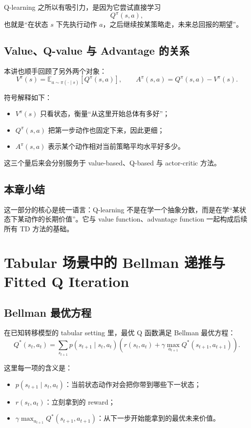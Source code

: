 \documentclass[a4paper]{article}
\begin{document}
Q-learning 之所以有吸引力，是因为它尝试直接学习
\[
Q^\pi(s,a),
\]
也就是“在状态 \(s\) 下先执行动作 \(a\)，之后继续按某策略走，未来总回报的期望”。

\subsection{Value、Q-value 与 Advantage 的关系}

本讲也顺手回顾了另外两个对象：
\[
V^\pi(s)=\mathbb{E}_{a\sim\pi(\cdot\mid s)}[Q^\pi(s,a)],
\qquad
A^\pi(s,a)=Q^\pi(s,a)-V^\pi(s).
\]

符号解释如下：
\begin{itemize}
\item \(V^\pi(s)\) 只看状态，衡量“从这里开始总体有多好”；
\item \(Q^\pi(s,a)\) 把第一步动作也固定下来，因此更细；
\item \(A^\pi(s,a)\) 表示某个动作相对当前策略平均水平好多少。
\end{itemize}

这三个量后来会分别服务于 value-based、Q-based 与 actor-critic 方法。

\subsection{本章小结}

这一部分的核心是统一语言：Q-learning 不是在学一个抽象分数，而是在学“某状态下某动作的长期价值”。它与 value function、advantage function 一起构成后续所有 TD 方法的基础。

\section{Tabular 场景中的 Bellman 递推与 Fitted Q Iteration}

\subsection{Bellman 最优方程}

在已知转移模型的 tabular setting 里，最优 Q 函数满足 Bellman 最优方程：
\[
Q^*(s_t,a_t)=\sum_{s_{t+1}} p(s_{t+1}\mid s_t,a_t)\left(r(s_t,a_t)+\gamma \max_{a_{t+1}} Q^*(s_{t+1},a_{t+1})\right).
\]

这里每一项的含义是：
\begin{itemize}
\item \(p(s_{t+1}\mid s_t,a_t)\)：当前状态动作对会把你带到哪些下一状态；
\item \(r(s_t,a_t)\)：立刻拿到的 reward；
\item \(\gamma \max_{a_{t+1}} Q^*(s_{t+1},a_{t+1})\)：从下一步开始能拿到的最优未来价值。
\end{itemize}
\end{document}
